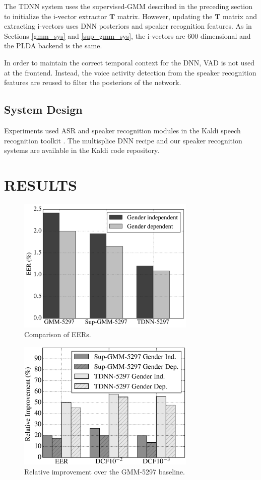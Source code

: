 \documentclass{article}
\begin{document}
The TDNN system uses the supervised-GMM described in the preceding 
section to initialize the i-vector extractor $\boldsymbol{T}$ matrix.
However, updating the $\boldsymbol{T}$ matrix and extracting 
i-vectors uses DNN posteriors and 
speaker recognition features. As in Sections \ref{gmm_sys} and \ref{sup_gmm_sys},
 the i-vectors are 600 dimensional and the PLDA backend is the same.

In order to maintain the correct temporal context for the DNN, VAD
is not used at the frontend. Instead, the voice activity detection from the speaker recognition
features are reused to filter the posteriors of the network.

\subsection{System Design}
Experiments used ASR and speaker recognition modules in the
Kaldi speech recognition toolkit \cite{kaldi}. The multisplice
DNN recipe and our speaker recognition systems are available in
the Kaldi code repository.

\section{RESULTS}

\begin{figure}[t]
\centerline{\includegraphics[width=8.5cm]{fig/eer}}
\caption{Comparison of EERs.}
\label{fig:eer}
\end{figure}

\begin{figure}[th]
\centerline{\includegraphics[width=8.5cm]{fig/rel}}
\caption{Relative improvement over
              the GMM-5297 baseline.}
\label{fig:rel}
\end{figure}
\end{document}
